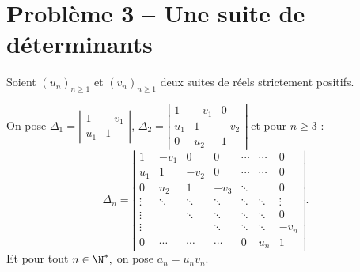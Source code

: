 \documentclass[twoside,french,11pt]{VcCours}
\begin{document}
\newpage
\section*{Problème 3 -- Une suite de déterminants}
Soient $(u_n)_{n \geq 1}$ et $(v_n)_{n \geq 1}$ deux suites de réels strictement positifs.

On pose $\Delta_1=\left|\begin{array}{cc}1 &-v_1\\ u_1 & 1\end{array}\right|$,
$\Delta_2=\left|\begin{array}{ccc}1 &-v_1 & 0\\ u_1 & 1 & -v_2\\0 & u_2 & 1\end{array}\right|$ et pour $n\geq 3$ :
$$\Delta_n=\left|\begin{array}{ccccccc}
1 &-v_1 & 0 &0 & \cdots &\cdots & 0\\
 u_1 & 1 & -v_2 &0 & \cdots &\cdots & 0\\
 0 & u_2 & 1 & -v_3 &\ddots & & 0\\
 \vdots &\ddots & \ddots & \ddots & \ddots & \ddots & \vdots\\
  \vdots &  & \ddots & \ddots & \ddots & \ddots & 0\\
  \vdots &  &   & \ddots & \ddots & \ddots & -v_n\\ 
  0 & \cdots & \cdots & \cdots & 0 & u_n & 1  
\end{array}\right|.$$
Et pour tout $n\in\N^*,$ on pose $a_n=u_nv_n.$
\end{document}
